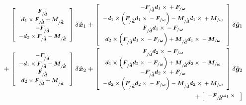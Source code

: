 \documentclass[10pt,dvips,fleqn,subeqn]{report}
\newcommand{\T}[1]{\bm{#1}}
\begin{document}
\begin{align}
	\footnotesize
	\sqbr{\matr{c}{
		\T{F}_{/\dot{\tilde{\T{d}}}} \\
		\T{d}_1 \times \T{F}_{/\dot{\tilde{\T{d}}}}
			+ \T{M}_{/\dot{\tilde{\T{d}}}} \\
		- \T{F}_{/\dot{\tilde{\T{d}}}} \\
		- \T{d}_2 \times \T{F}_{/\dot{\tilde{\T{d}}}}
			- \T{M}_{/\dot{\tilde{\T{d}}}}
	}} \delta\dot{\T{x}}_1
%
	+ \sqbr{\matr{c}{
		-\T{F}_{/\dot{\tilde{\T{d}}}} \T{d}_1\times{}
			+ \T{F}_{/\T{\omega}} \\
		- \T{d}_1 \times \plbr{
			\T{F}_{/\dot{\tilde{\T{d}}}} \T{d}_1\times{}
			- \T{F}_{/\T{\omega}}
		}
			- \T{M}_{/\dot{\tilde{\T{d}}}} \T{d}_1\times{}
			+ \T{M}_{/\T{\omega}} \\
		\T{F}_{/\dot{\tilde{\T{d}}}} \T{d}_1\times{}
			- \T{F}_{/\T{\omega}} \\
		\T{d}_2 \times \plbr{
			\T{F}_{/\dot{\tilde{\T{d}}}} \T{d}_1\times{}
			- \T{F}_{/\T{\omega}}
		}
			+ \T{M}_{/\dot{\tilde{\T{d}}}} \T{d}_1\times{}
			- \T{M}_{/\T{\omega}}
	}} \delta\dot{\T{g}}_1
	& \nonumber \\
%
	\footnotesize
	\mbox{}
	+ \sqbr{\matr{c}{
		- \T{F}_{/\dot{\tilde{\T{d}}}} \\
		- \T{d}_1 \times \T{F}_{/\dot{\tilde{\T{d}}}}
			- \T{M}_{/\dot{\tilde{\T{d}}}} \\
		\T{F}_{/\dot{\tilde{\T{d}}}} \\
		\T{d}_2 \times \T{F}_{/\dot{\tilde{\T{d}}}}
			+ \T{M}_{/\dot{\tilde{\T{d}}}}
	}} \delta\dot{\T{x}}_2
%
	+ \sqbr{\matr{c}{
		\T{F}_{/\dot{\tilde{\T{d}}}} \T{d}_2\times{}
			- \T{F}_{/\T{\omega}} \\
		\T{d}_1 \times \plbr{
			\T{F}_{/\dot{\tilde{\T{d}}}} \T{d}_2\times{}
			- \T{F}_{/\T{\omega}}
		}
			+ \T{M}_{/\dot{\tilde{\T{d}}}} \T{d}_2\times{}
			- \T{M}_{/\T{\omega}} \\
		- \T{F}_{/\dot{\tilde{\T{d}}}} \T{d}_2\times{}
			+ \T{F}_{/\T{\omega}} \\
		- \T{d}_2 \times \plbr{
			\T{F}_{/\dot{\tilde{\T{d}}}} \T{d}_2\times{}
			- \T{F}_{/\T{\omega}}
		}
			- \T{M}_{/\dot{\tilde{\T{d}}}} \T{d}_2\times{}
			+ \T{M}_{/\T{\omega}}
	}} \delta\dot{\T{g}}_2
	& \nonumber \\
%
%
%
	\footnotesize
	\mbox{} + \sqbr{\cvvect{
		- \T{F}_{/\dot{\tilde{\T{d}}}} \T{\omega}_1 \times{} \\
}}
\end{align}
\end{document}
